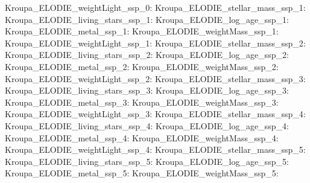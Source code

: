 Kroupa\_ELODIE\_weightLight\_ssp\_0:  \newline 
Kroupa\_ELODIE\_stellar\_mass\_ssp\_1:  \newline 
Kroupa\_ELODIE\_living\_stars\_ssp\_1:  \newline 
Kroupa\_ELODIE\_log\_age\_ssp\_1:  \newline 
Kroupa\_ELODIE\_metal\_ssp\_1:  \newline 
Kroupa\_ELODIE\_weightMass\_ssp\_1:  \newline 
Kroupa\_ELODIE\_weightLight\_ssp\_1:  \newline 
Kroupa\_ELODIE\_stellar\_mass\_ssp\_2:  \newline 
Kroupa\_ELODIE\_living\_stars\_ssp\_2:  \newline 
Kroupa\_ELODIE\_log\_age\_ssp\_2:  \newline 
Kroupa\_ELODIE\_metal\_ssp\_2:  \newline 
Kroupa\_ELODIE\_weightMass\_ssp\_2:  \newline 
Kroupa\_ELODIE\_weightLight\_ssp\_2:  \newline 
Kroupa\_ELODIE\_stellar\_mass\_ssp\_3:  \newline 
Kroupa\_ELODIE\_living\_stars\_ssp\_3:  \newline 
Kroupa\_ELODIE\_log\_age\_ssp\_3:  \newline 
Kroupa\_ELODIE\_metal\_ssp\_3:  \newline 
Kroupa\_ELODIE\_weightMass\_ssp\_3:  \newline 
Kroupa\_ELODIE\_weightLight\_ssp\_3:  \newline 
Kroupa\_ELODIE\_stellar\_mass\_ssp\_4:  \newline 
Kroupa\_ELODIE\_living\_stars\_ssp\_4:  \newline 
Kroupa\_ELODIE\_log\_age\_ssp\_4:  \newline 
Kroupa\_ELODIE\_metal\_ssp\_4:  \newline 
Kroupa\_ELODIE\_weightMass\_ssp\_4:  \newline 
Kroupa\_ELODIE\_weightLight\_ssp\_4:  \newline 
Kroupa\_ELODIE\_stellar\_mass\_ssp\_5:  \newline 
Kroupa\_ELODIE\_living\_stars\_ssp\_5:  \newline 
Kroupa\_ELODIE\_log\_age\_ssp\_5:  \newline 
Kroupa\_ELODIE\_metal\_ssp\_5:  \newline 
Kroupa\_ELODIE\_weightMass\_ssp\_5:  \newline 
